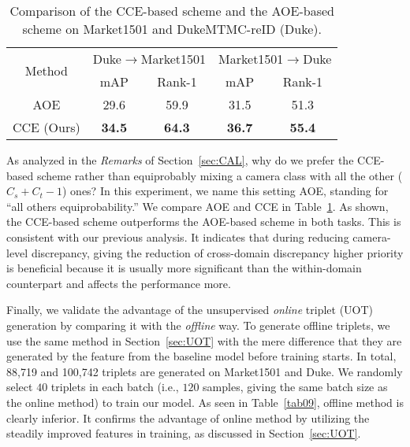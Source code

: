 \documentclass[10pt,twocolumn,letterpaper]{article}
\begin{document}
 


 
 
\begin{table}[htbp]
 \centering
 \caption{Comparison of the CCE-based scheme and the AOE-based scheme on Market1501 and DukeMTMC-reID (Duke).}
   \begin{adjustbox}{width=0.4\textwidth}
   \begin{tabular}{|c|cc|cc|}
   \toprule
   \multirow{2}[1]{*}{Method} & \multicolumn{2}{c|}{Duke$\rightarrow$Market1501} & \multicolumn{2}{c|}{Market1501$\rightarrow$Duke} \\
\cmidrule{2-5}         & mAP  & Rank-1 & mAP  & Rank-1 \\
   \midrule
   AOE   & 29.6 & 59.9 & 31.5 & 51.3 \\
   \midrule
   CCE (Ours) & \textcolor[rgb]{ 1, 0, 0}{\textbf{34.5}} & \textcolor[rgb]{ 1, 0, 0}{\textbf{64.3}} & \textcolor[rgb]{ 1, 0, 0}{\textbf{36.7}} & \textcolor[rgb]{ 1, 0, 0}{\textbf{55.4}} \\
   \bottomrule
   \end{tabular}\end{adjustbox}
 \label{tab10}\vspace*{-10pt}
\end{table}

 
As analyzed in the \textit{Remarks} of Section~\ref{sec:CAL}, why do we prefer the CCE-based scheme rather than equiprobably mixing a camera class with all the other ($C_{s} + C_{t}-1$) ones? In this experiment, we name this setting AOE, standing for ``all others equiprobability.'' We compare AOE and CCE in Table~\ref{tab10}. As shown, the CCE-based scheme outperforms the AOE-based scheme in both tasks. This is consistent with our previous analysis. It indicates that during reducing camera-level discrepancy, giving the reduction of cross-domain discrepancy higher priority is beneficial because it is usually more significant than the within-domain counterpart and affects the performance more.
 
 
Finally, we validate the advantage of the unsupervised \textit{online} triplet (UOT) generation by comparing it with the \textit{offline} way. To generate offline triplets, we use the same method in Section~\ref{sec:UOT} with the mere difference that they are generated by the feature from the baseline model before training starts.
In total, 88,719 and 100,742 triplets are generated on Market1501 and Duke. We randomly select $40$ triplets in each batch (i.e., $120$ samples, giving the same batch size as the online method) to train our model. As seen in Table~\ref{tab09}, offline method is clearly inferior. It confirms the advantage of online method by utilizing the steadily improved features in training, as discussed in Section~\ref{sec:UOT}.
 
\end{document}

